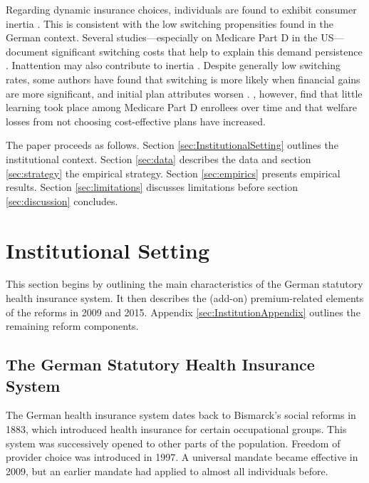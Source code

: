 \documentclass[a4paper, 11pt, english]{article}
\begin{document}
Regarding dynamic insurance choices, individuals are found to exhibit consumer inertia \citep[e.g.,][]{Handel2013}. This is consistent with the low switching propensities found in the German context. Several studies---especially on Medicare Part D in the US---document significant switching costs that help to explain this demand persistence \citep{nosal2012estimating, miller2012estimating, marzilli2014consumer, polyakova2016regulation}. Inattention may also contribute to inertia \citep{Kiss2014, heiss2016inattention, ho2017impact}. Despite generally low switching rates, some authors have found that switching is more likely when financial gains are more significant, and initial plan attributes worsen \citep{ketcham2012sinking, hoadley2013switch}. \citet{abaluck2016evolving}, however, find that little learning took place among Medicare Part D enrollees over time and that welfare losses from not choosing cost-effective plans have increased.


The paper proceeds as follows. Section \ref{sec:InstitutionalSetting} outlines the institutional context. Section \ref{sec:data} describes the data and section \ref{sec:strategy} the empirical strategy. Section \ref{sec:empirics} presents empirical results. Section \ref{sec:limitations} discusses limitations before section \ref{sec:discussion} concludes.

\section{Institutional Setting \label{sec:InstitutionalSetting}}

This section begins by outlining the main characteristics of the German statutory health insurance system. It then describes the (add-on) premium-related elements of the reforms in 2009 and 2015. Appendix \ref{sec:InstitutionAppendix} outlines the remaining reform components.

\subsection{The German Statutory Health Insurance System \label{subsec:GSHI}}

The German health insurance system dates back to Bismarck's social reforms in 1883, which introduced health insurance for certain occupational groups. This system was successively opened to other parts of the population. Freedom of provider choice was introduced in 1997. A universal mandate became effective in 2009, but an earlier mandate had applied to almost all individuals before.
\end{document}
